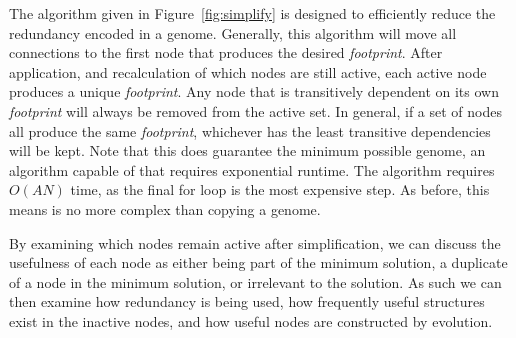 \documentclass[journal]{IEEEtran}
\begin{document}
The  algorithm given in Figure~\ref{fig:simplify} is designed
to efficiently reduce the redundancy encoded in a genome.  Generally, this
algorithm will move all connections to the first node that produces the desired
\emph{footprint}.  After application, and recalculation of which nodes are still
active, each active node produces a unique \emph{footprint}.  Any node that is
transitively dependent on its own \emph{footprint} will always be removed from
the active set.  In general, if a set of nodes all produce the same \emph{footprint},
whichever has the least transitive dependencies will be kept.  Note that this
does guarantee the minimum possible genome, an algorithm capable of that requires
exponential runtime.  The  algorithm requires $O(AN)$ time,
as the final for loop is the most expensive step.  As before, this means
 is no more complex than copying a genome.

By examining which nodes remain active after simplification, we can discuss
the usefulness of each node as either being part of the minimum solution, a
duplicate of a node in the minimum solution, or irrelevant to the solution.
As such we can then examine how redundancy is being used, how frequently useful
structures exist in the inactive nodes, and how useful nodes are constructed by evolution.
\end{document}
